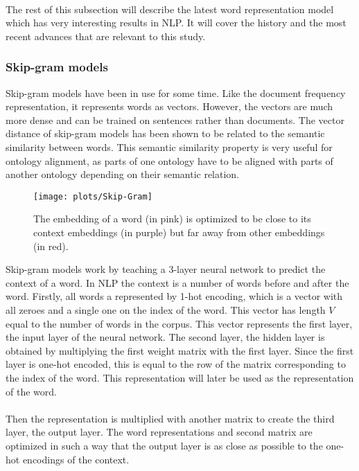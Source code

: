\documentclass{article}
\begin{document}
 \paragraph{}
 The rest of this subsection will describe the latest word representation model which has very interesting results in NLP. It will cover the history and the most recent advances that are relevant to this study.
 
 \subsubsection{Skip-gram models}
 Skip-gram models have been in use for some time. Like the document frequency representation, it represents words as vectors. However, the vectors are much more dense and can be trained on sentences rather than documents. The vector distance of skip-gram models has been shown to be related to the semantic similarity between words. This semantic similarity property is very useful for ontology alignment, as parts of one ontology have to be aligned with parts of another ontology depending on their semantic relation.
  
 \begin{figure}[H]
 \centering
 \texttt{[image: plots/Skip-Gram]}
 \caption[Skip-Gram model]{The embedding of a word (in pink) is optimized to be close to its context embeddings (in purple) but far away from other embeddings (in red).}
 \label{Skip-Gram-img2}
 \end{figure}
 
 Skip-gram models work by teaching a 3-layer neural network to predict the context of a word. In NLP the context is a number of words before and after the word. Firstly, all words a represented by 1-hot encoding, which is a vector with all zeroes and a single one on the index of the word. This vector has length $V$ equal to the number of words in the corpus. This vector represents the first layer, the input layer of the neural network. The second layer, the hidden layer is obtained by multiplying the first weight matrix with the first layer. Since the first layer is one-hot encoded, this is equal to the row of the matrix corresponding to the index of the word. This representation will later be used as the representation of the word.
 \paragraph{}
 Then the representation is multiplied with another matrix to create the third layer, the output layer. The word representations and second matrix are optimized in such a way that the output layer is as close as possible to the one-hot encodings of the context.
\end{document}
